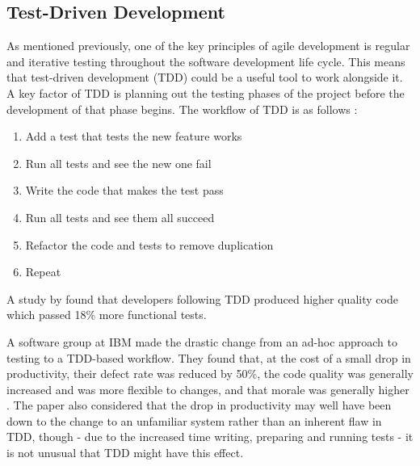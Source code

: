 \subsection{Test-Driven Development}
As mentioned previously, one of the key principles of agile development is regular and iterative testing throughout the software development life cycle.
This means that test-driven development (TDD) could be a useful tool to work alongside it.
A key factor of TDD is planning out the testing phases of the project before the development of that phase begins.
The workflow of TDD is as follows \citep{Beck:2002:TDD:579193}:
\begin{enumerate}
	\item Add a test that tests the new feature works
	\item Run all tests and see the new one fail
	\item Write the code that makes the test pass
	\item Run all tests and see them all succeed
	\item Refactor the code and tests to remove duplication
	\item Repeat
\end{enumerate}

A study by \cite{George:2003:IIT:952532.952753} found that developers following TDD produced higher quality code which passed 18\% more functional tests.

A software group at IBM made the drastic change from an ad-hoc approach to testing to a TDD-based workflow. They found that, at the cost of a small drop in productivity, their defect rate was reduced by 50\%, the code quality was generally increased and was more flexible to changes, and that morale was generally higher \citep{IBMTDD}. 
The paper also considered that the drop in productivity may well have been down to the change to an unfamiliar system rather than an inherent flaw in TDD, though - due to the increased time writing, preparing and running tests - it is not unusual that TDD might have this effect.